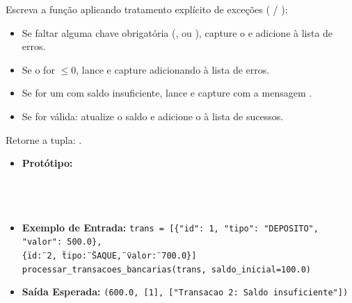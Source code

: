 \begin{enumerate}[label=\textbf{Q\arabic*.}, start=1]
Escreva a função  aplicando tratamento explícito de exceções ( / ):
\begin{itemize}[leftmargin=*]
    \item Se faltar alguma chave obrigatória (,  ou ), capture o  e adicione  à lista de erros.
    \item Se o  for $\le 0$, lance e capture  adicionando  à lista de erros.
    \item Se for um  com saldo insuficiente, lance e capture  com a mensagem .
    \item Se for válida: atualize o saldo e adicione o  à lista de sucessos.
\end{itemize}
Retorne a tupla: .

\begin{itemize}[leftmargin=*]
    \item \textbf{Protótipo:}\newline {}\\\\\\\\
    \item \textbf{Exemplo de Entrada:}\newline
    \texttt{trans = [\{"id": 1, "tipo": "DEPOSITO", "valor": 500.0\},}\\\texttt{\phantom{trans = [}\{\"id\": 2, \"tipo\": \"SAQUE\", \"valor\": 700.0\}]}\\\texttt{processar\_transacoes\_bancarias(trans, saldo\_inicial=100.0)}
    \item \textbf{Saída Esperada:}\newline
    \texttt{(600.0, [1], ["Transacao 2: Saldo insuficiente"])}
\end{itemize}



\vspace{0.5cm}


\end{enumerate}
